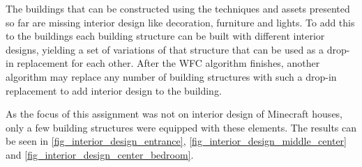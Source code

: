 \documentclass[
oneside,
fontsize=11pt
]{scrartcl}
\begin{document}
The buildings that can be constructed using the techniques and assets presented so far
are missing interior design like decoration, furniture and lights. 
To add this to the buildings each building structure can be built with different interior designs,
yielding a set of variations of that structure that can be used as a drop-in replacement for each other.
After the WFC algorithm finishes, another algorithm may replace any number of building structures 
with such a drop-in replacement to add interior design to the building. 

As the focus of this assignment was not on interior design of Minecraft houses, 
only a few building structures were equipped with these elements. 
The results can be seen in 
\autoref{fig_interior_design_entrance}, \autoref{fig_interior_design_middle_center} and 
\autoref{fig_interior_design_center_bedroom}. 
\end{document}
